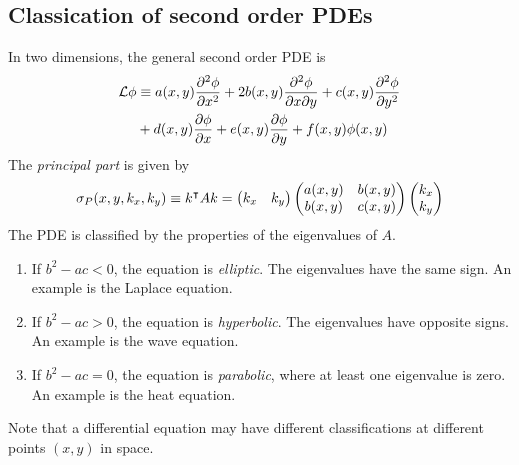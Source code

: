 \subsection{Classication of second order PDEs}
In two dimensions, the general second order PDE is
\begin{align*}
	\mathcal L \phi & \equiv a(x,y) \pdv[2]{\phi}{x} + 2 b(x,y) \pdv{\phi}{x}{y} + c(x,y) \pdv[2]{\phi}{y} \\
	                & + d(x,y) \pdv{\phi}{x} + e(x,y) \pdv{\phi}{y} + f(x,y) \phi(x,y)
\end{align*}
The \textit{principal part} is given by
\[
	\sigma_P (x,y,k_x,k_y) \equiv k^\intercal A k = \begin{pmatrix}
		k_x & k_y
	\end{pmatrix} \begin{pmatrix}
		a(x,y) & b(x,y) \\
		b(x,y) & c(x,y)
	\end{pmatrix} \begin{pmatrix}
		k_x \\ k_y
	\end{pmatrix}
\]
The PDE is classified by the properties of the eigenvalues of \( A \).
\begin{enumerate}
	\item If \( b^2 - ac < 0 \), the equation is \textit{elliptic}.
	      The eigenvalues have the same sign.
	      An example is the Laplace equation.
	\item If \( b^2 - ac > 0 \), the equation is \textit{hyperbolic}.
	      The eigenvalues have opposite signs.
	      An example is the wave equation.
	\item If \( b^2 - ac = 0 \), the equation is \textit{parabolic}, where at least one eigenvalue is zero.
	      An example is the heat equation.
\end{enumerate}
Note that a differential equation may have different classifications at different points \( (x,y) \) in space.

